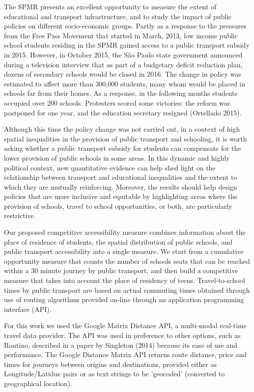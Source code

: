 \documentclass[]{article}
\begin{document}
The SPMR presents an excellent opportunity to measure the extent of
educational and transport infrastructure, and to study the impact of
public policies on different socio-economic groups. Partly as a response
to the pressures from the Free Pass Movement that started in March,
2013, low income public school students residing in the SPMR gained
access to a public transport subsidy in 2015. However, in October 2015,
the São Paulo state government announced during a television interview
that as part of a budgetary deficit reduction plan, dozens of secondary
schools would be closed in 2016. The change in policy was estimated to
affect more than 300,000 students, many whom would be placed in schools
far from their homes. As a response, in the following months students
occupied over 200 schools. Protesters scored some victories: the reform
was postponed for one year, and the education secretary resigned
(Ortellado 2015).

Although this time the policy change was not carried out, in a context
of high spatial inequalities in the provision of public transport and
schooling, it is worth asking whether a public transport subsidy for
students can compensate for the lower provision of public schools in
some areas. In this dynamic and highly political context, new
quantitative evidence can help shed light on the relationship between
transport and educational inequalities and the extent to which they are
mutually reinforcing. Moreover, the results should help design policies
that are more inclusive and equitable by highlighting areas where the
provision of schools, travel to school opportunities, or both, are
particularly restrictive.

Our proposed competitive accessibility measure combines information
about the place of residence of students, the spatial distribution of
public schools, and public transport accessibility into a single
measure. We start from a cumulative opportunity measure that counts the
number of schools seats that can be reached within a 30 minute journey
by public transport, and then build a competitive measure that takes
into account the place of residency of teens. Travel-to-school times by
public transport are based on actual commuting times obtained through
use of routing algorithms provided on-line through an application
programming interface (API).

For this work we used the Google Matrix Distance API, a multi-modal
real-time travel data provider. 
The API was used in preference to other options,
such as Routino, described in a paper by Singleton (2014)
because its
ease of use and performance. The Google Distance Matrix
API returns
route distance, price and times for journeys between origins and
destinations, provided either as Longitude/Latidue pairs or
as text strings to be 'geocoded' (converted to geographical location).
\end{document}
